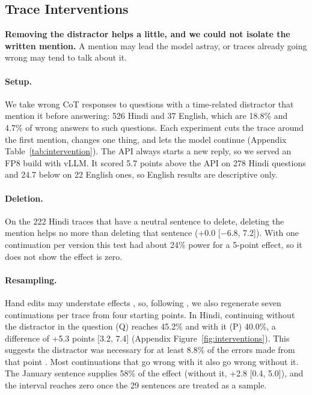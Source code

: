 \documentclass[11pt]{article}
\begin{document}
\subsection{Trace Interventions}
\label{sec:interventions}

\textbf{Removing the distractor helps a little, and we could not isolate the written mention.} A mention may lead the model astray, or traces already going wrong may tend to talk about it.

\paragraph{Setup.}
We take wrong CoT responses to questions with a time-related distractor that mention it before answering: 526 Hindi and 37 English, which are 18.8\% and 4.7\% of wrong answers to such questions. Each experiment cuts the trace around the first mention, changes one thing, and lets the model continue (Appendix Table~\ref{tab:intervention}). The API always starts a new reply, so we served an FP8 build with vLLM. It scored 5.7 points above the API on 278 Hindi questions and 24.7 below on 22 English ones, so English results are descriptive only.

\paragraph{Deletion.}
On the 222 Hindi traces that have a neutral sentence to delete, deleting the mention helps no more than deleting that sentence (+0.0 [$-$6.8, 7.2]). With one continuation per version this test had about 24\% power for a 5-point effect, so it does not show the effect is zero.

\paragraph{Resampling.}
Hand edits may understate effects \citep{macar-etal-2026-branches}, so, following \citet{bogdan-etal-2025-anchors}, we also regenerate seven continuations per trace from four starting points. In Hindi, continuing without the distractor in the question (Q) reaches 45.2\% and with it (P) 40.0\%, a difference of +5.3 points [3.2, 7.4] (Appendix Figure~\ref{fig:interventions}). This suggests the distractor was necessary for at least 8.8\% of the errors made from that point \citep{tian-pearl-2000-probabilities}. Most continuations that go wrong with it also go wrong without it. The January sentence supplies 58\% of the effect (without it, +2.8 [0.4, 5.0]), and the interval reaches zero once the 29 sentences are treated as a sample.
\end{document}
